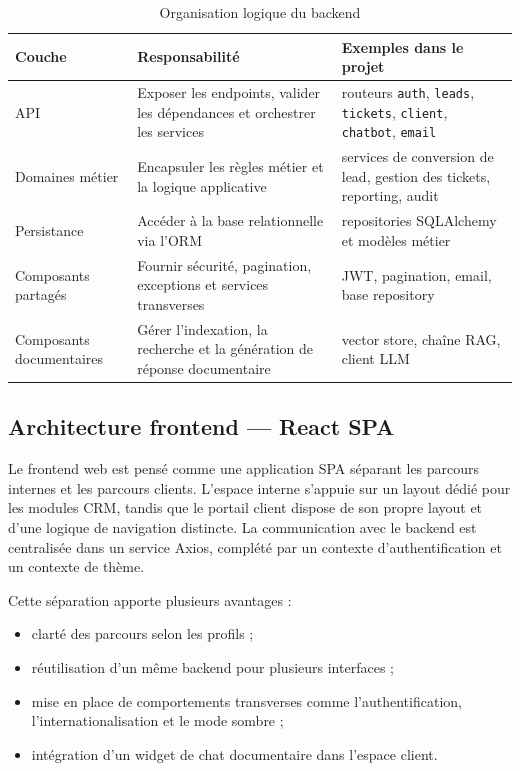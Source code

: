 \begin{table}[H]
\centering
\caption{Organisation logique du backend}
\label{tab:arch_backend}
\begin{tabularx}{\textwidth}{|l|X|X|}
\hline
\textbf{Couche} & \textbf{Responsabilité} & \textbf{Exemples dans le projet} \\
\hline
API & Exposer les endpoints, valider les dépendances et orchestrer les services & routeurs \texttt{auth}, \texttt{leads}, \texttt{tickets}, \texttt{client}, \texttt{chatbot}, \texttt{email} \\
\hline
Domaines métier & Encapsuler les règles métier et la logique applicative & services de conversion de lead, gestion des tickets, reporting, audit \\
\hline
Persistance & Accéder à la base relationnelle via l'ORM & repositories SQLAlchemy et modèles métier \\
\hline
Composants partagés & Fournir sécurité, pagination, exceptions et services transverses & JWT, pagination, email, base repository \\
\hline
Composants documentaires & Gérer l'indexation, la recherche et la génération de réponse documentaire & vector store, chaîne RAG, client LLM \\
\hline
\end{tabularx}
\end{table}

\subsection{Architecture frontend --- React SPA}
Le frontend web est pensé comme une application SPA séparant les parcours internes et les parcours clients. L'espace interne s'appuie sur un layout dédié pour les modules CRM, tandis que le portail client dispose de son propre layout et d'une logique de navigation distincte. La communication avec le backend est centralisée dans un service Axios, complété par un contexte d'authentification et un contexte de thème.\par
\vspace{0.3cm}

Cette séparation apporte plusieurs avantages :
\begin{itemize}
    \item clarté des parcours selon les profils ;
    \item réutilisation d'un même backend pour plusieurs interfaces ;
    \item mise en place de comportements transverses comme l'authentification, l'internationalisation et le mode sombre ;
    \item intégration d'un widget de chat documentaire dans l'espace client.
\end{itemize}

